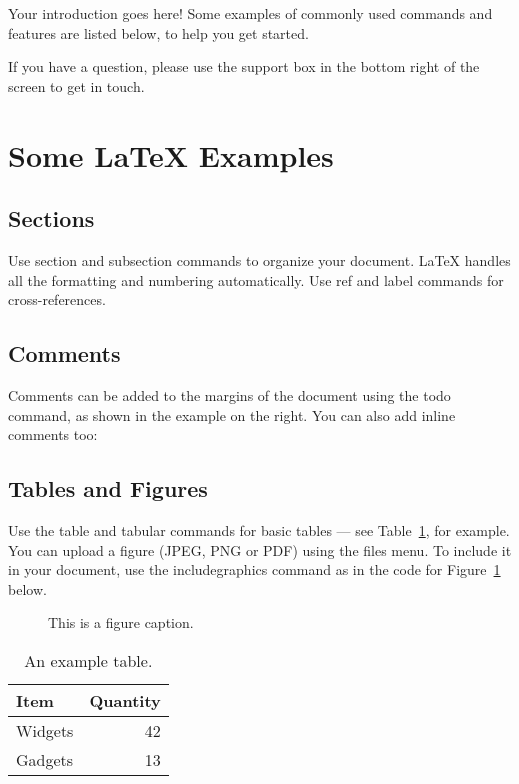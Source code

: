 	Your introduction goes here! Some examples of commonly used commands and features are listed below, to help you get started.
	
	If you have a question, please use the support box in the bottom right of the screen to get in touch. 
	
	\section{Some \LaTeX{} Examples}
	\label{sec:examples}
	
	\subsection{Sections}
	
	Use section and subsection commands to organize your document. \LaTeX{} handles all the formatting and numbering automatically. Use ref and label commands for cross-references.
	
	\subsection{Comments}
	
	Comments can be added to the margins of the document using the  todo command, as shown in the example on the right. You can also add inline comments too:
	
	
	\subsection{Tables and Figures}
	
	Use the table and tabular commands for basic tables --- see Table~\ref{tab:widgets}, for example. You can upload a figure (JPEG, PNG or PDF) using the files menu. To include it in your document, use the includegraphics command as in the code for Figure~\ref{fig:frog} below.
	
	\begin{figure}
		\centering
		\caption{\label{fig:frog}This is a figure caption.}
	\end{figure}
	
	\begin{table}
		\centering
		\begin{tabular}{l|r}
			Item & Quantity \\\hline
			Widgets & 42 \\
			Gadgets & 13
		\end{tabular}
		\caption{\label{tab:widgets}An example table.}
	\end{table}
	
